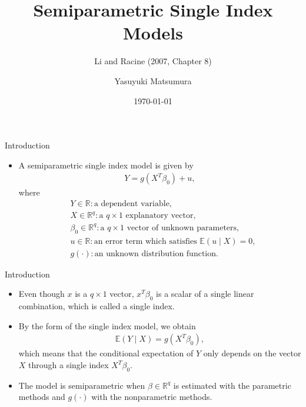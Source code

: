 \documentclass[xcolor=svgnames,dvipdfmx,cjk]{beamer}
\theoremstyle{example}
\begin{document}
 

\title{Semiparametric Single Index Models} 
\subtitle{Li and Racine (2007, Chapter 8)}
\author{Yasuyuki Matsumura}
\date{\today} %

\begin{frame}                  
\titlepage            
\end{frame}




\begin{frame}{Introduction}
  \begin{itemize}
    \item  \alert{A semiparametric single index model} is given by 
            \begin{align*}
              Y = g (X^{T} \beta_0) + u,
            \end{align*}
           where  
            \begin{align*}
              & Y \in \mathbb{R}: \text{a dependent variable}, \\
              & X \in \mathbb{R}^{q}: \text{a }  q \times 1 \text{ explanatory vector}, \\
              & \beta_0 \in \mathbb{R}^{q}: \text{a }  q \times 1 \text{ vector of unknown parameters}, \\
              & u \in \mathbb{R}: \text{an error term which satisfies } \mathbb{E}(u \mid X) =0, \\
              & g(\cdot): \text{an unknown distribution function}.
            \end{align*}
  \end{itemize}
\end{frame}

\begin{frame}{Introduction}
  \begin{itemize}
    \item Even though $x$ is a $q\times1$ vector, 
          $x^{T} \beta_0$ is a scalar of a single linear combination, 
          which is called \alert{a single index}.
    \item By the form of the single index model, we obtain
          \begin{align*}
            \mathbb{E}(Y \mid X) = g(X^{T} \beta_0),
          \end{align*}
          which means that 
          the conditional expectation of $Y$ 
          only depends on the vector $X$
          through a single index $X^{T} \beta_0$.
    \item The model is semiparametric 
          when $\beta \in \mathbb{R}^{q}$ is estimated with the parametric methods
          and $g(\cdot)$ with the nonparametric methods.
  \end{itemize}
\end{frame}
\end{document}
